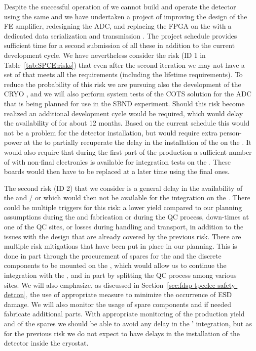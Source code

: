 Despite the successful operation of  we cannot build and operate
the   detector using the same  and we have
undertaken a project of improving the design of the FE amplifier, redesigning
the ADC, and replacing the FPGA on the  with a dedicated data
serialization and transmission . The project schedule provides
sufficient time for a second submission of all these  in addition
to the current development cycle. We have nevertheless consider the risk (ID 1
in Table~\ref{tab:SPCE:risks}) that even after the second iteration 
we may not have a set of  that meets all the  requirements
(including the lifetime requirements). To reduce the probability of this 
risk we are pursuing also the development of the CRYO , and we
will also perform system tests of the COTS solution for the ADC that is being
planned for use in the SBND experiment. Should this risk become realized an
additional development cycle would be required, which would delay the availability
of  for about 12 months. Based on the current schedule this would
not be a problem for the detector installation, but would require extra 
person-power at the  to partially recuperate the delay in the
installation of the  on the . It would also require
that during the first part of the  production a sufficient number
of  with non-final electronics is available for integration tests
on the . These boards would then have to be replaced at a later
time using the final ones.

The second risk (ID 2) that we consider is a general delay in the availability of the 
and / or  which would then not be available for the integration
on the . There could be multiple triggers for this risk: a lower yield 
compared to our planning assumptions during the  and  
fabrication or during the QC process, down-times at one of the QC sites, or losses during 
handling and transport, in addition to the issues with the design that are already 
covered by the previous risk. There are multiple risk mitigations that have been
put in place in our planning. This is done in part through the procurement of
spares for the  and the discrete components to be mounted on the
, which would allow us to continue the integration with the ,
and in part by splitting the QC process among various sites. We will also emphasize,
as discussed in Section~\ref{sec:fdsp-tpcelec-safety-detcon}, the use of appropriate
measure to minimize the occurrence of ESD damage. We will also monitor the usage
of spare components and if needed fabricate additional parts. With appropriate
monitoring of the production yield and of the spares we should be able to avoid
any delay in the ' integration, but as for the previous risk we
do not expect to have delays in the installation of the detector inside the cryostat.
 
